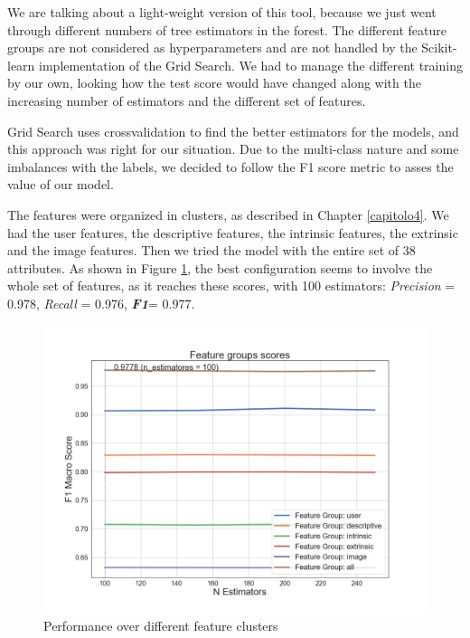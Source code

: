 We are talking about a light-weight version of this tool, because we just went through different numbers of tree estimators in the forest. The different feature groups are not considered as hyperparameters and are not handled by the Scikit-learn implementation of the Grid Search.
We had to manage the different training by our own, looking how the test score would have changed along with the increasing number of estimators and the different set of features.

Grid Search uses crossvalidation to find the better estimators for the models, and this approach was right for our situation.
Due to the multi-class nature and some imbalances with the labels, we decided to follow the F1 score metric to asses the value of our model.

The features were organized in clusters, as described in Chapter \ref{capitolo4}.
We had the user features, the descriptive features, the intrinsic features, the extrinsic and the image features. Then we tried the model with the entire set of 38 attributes.
As shown in Figure \ref{fig:feature_clusters}, the best configuration seems to involve the whole set of features, as it reaches these scores, with 100 estimators: \textit{Precision} = 0.978, \textit{Recall} = 0.976, \textbf{\textit{F1}}= 0.977.

\begin{figure}[htp!]
	\centering
	\includegraphics[width=\columnwidth]{chapter5/figure/feature_cluster_f1.png}
	\caption{Performance over different feature clusters}
	\label{fig:feature_clusters}
\end{figure}


